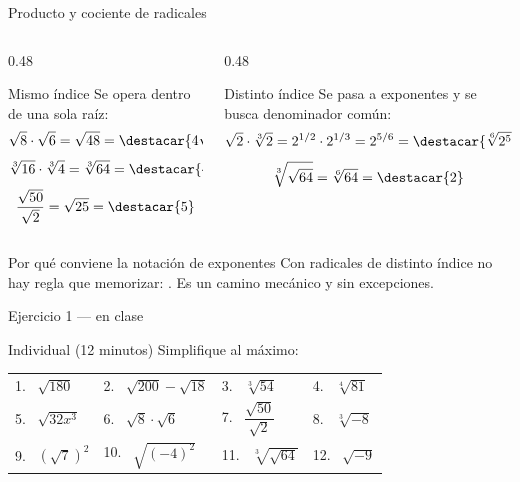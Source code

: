 \documentclass[aspectratio=169,10pt]{beamer}
\begin{document}
\begin{frame}{Producto y cociente de radicales}
  \scriptsize
  \begin{columns}[T,onlytextwidth]
    \begin{column}{0.48\textwidth}
      \begin{block}{Mismo índice}
        \tiny
        Se opera dentro de una sola raíz:
        \[ \sqrt{8}\cdot\sqrt{6} = \sqrt{48} = \destacar{4\sqrt{3}} \]
        \[ \sqrt[3]{16}\cdot\sqrt[3]{4} = \sqrt[3]{64} = \destacar{4} \]
        \[ \frac{\sqrt{50}}{\sqrt{2}} = \sqrt{25} = \destacar{5} \]
      \end{block}
    \end{column}
    \begin{column}{0.48\textwidth}
      \begin{block}{Distinto índice}
        \tiny
        Se pasa a exponentes y se busca denominador común:
        \[ \sqrt{2}\cdot\sqrt[3]{2} = 2^{1/2}\cdot 2^{1/3}
           = 2^{5/6} = \destacar{\sqrt[6]{2^{5}}} \]
        \[ \sqrt[3]{\sqrt{64}} = \sqrt[6]{64} = \destacar{2} \]
      \end{block}
    \end{column}
  \end{columns}

  \vspace{0.1cm}
  \begin{alertblock}{Por qué conviene la notación de exponentes}
    \scriptsize
    Con radicales de distinto índice no hay regla que memorizar:
    . Es un camino mecánico y sin
    excepciones.
  \end{alertblock}
\end{frame}

\begin{frame}{Ejercicio 1 — en clase}
  \begin{alertblock}{Individual (12 minutos)}
    \scriptsize
    Simplifique al máximo:

    \vspace{0.25cm}
    \centering
    \begin{tabular}{@{}llll@{}}
      1. \ $\sqrt{180}$ &
      2. \ $\sqrt{200}-\sqrt{18}$ &
      3. \ $\sqrt[3]{54}$ &
      4. \ $\sqrt[4]{81}$ \\[1.0em]
      5. \ $\sqrt{32x^{3}}$ &
      6. \ $\sqrt{8}\cdot\sqrt{6}$ &
      7. \ $\dfrac{\sqrt{50}}{\sqrt{2}}$ &
      8. \ $\sqrt[3]{-8}$ \\[1.0em]
      9. \ $\left(\sqrt{7}\right)^{2}$ &
      10. \ $\sqrt{(-4)^{2}}$ &
      11. \ $\sqrt[3]{\sqrt{64}}$ &
      12. \ $\sqrt{-9}$ \\
    \end{tabular}
  \end{alertblock}
\end{frame}
\end{document}
